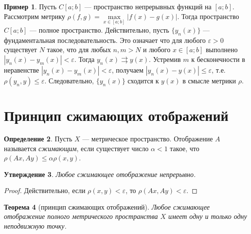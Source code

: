 \documentclass[12pt, titlepage, oneside]{amsbook}
\newtheorem{theorem}{Теорема}[chapter]
\newtheorem{claim}[theorem]{Утверждение}
\theoremstyle{definition}
\newtheorem{example}[theorem]{Пример}
\newtheorem{definition}[theorem]{Определение}
\theoremstyle{remark}
\begin{document}
\begin{example}
	Пусть $C[a;b]$ --- пространство непрерывных функций на $[a;b]$. Рассмотрим метрику $\rho(f,g)=\max\limits_{x\in[a;b]}|f(x)-g(x)|$. Тогда пространство $C[a;b]$ --- полное пространство. Действительно, пусть $\{y_n(x)\}$ --- фундаментальная последовательность. Это означает что для любого $\varepsilon>0$ существует $N$ такое, что для любых $n,m>N$ и любого $x\in[a;b]$ выполнено $|y_n(x)-y_m(x)|<\varepsilon$. Тогда $y_n(x)\rightrightarrows y(x)$. Устремив $m$ к бесконечности в неравенстве $|y_n(x)-y_m(x)|<\varepsilon$, получаем $|y_n(x)-y(x)|\leq\varepsilon$, т.е. $\rho(y_n,y)\leq\varepsilon$. Следовательно, $\{y_n(x)\}$ сходится к $y(x)$ в смысле метрики $\rho$.
\end{example}

\section{Принцип сжимающих отображений}

\begin{definition}
	Пусть $X$ --- метрическое пространство. Отображение $A$ называется \emph{сжимающим}, если существует число $\alpha<1$ такое, что $\rho(Ax,Ay)\leq\alpha\rho(x,y)$.
\end{definition}

\begin{claim}
	\label{Sj1}
	Любое сжимающее отображение непрерывно.
\end{claim}

\begin{proof}
	Действительно, если $\rho(x,y)<\varepsilon$, то $\rho(Ax,Ay)<\varepsilon$.
\end{proof}

\begin{theorem}[принцип сжимающих отображений]
	\label{Sj2}
	Любое сжимающее отображение полного метрического пространства $X$ имеет одну и только одну неподвижную точку.
\end{theorem}
\end{document}
